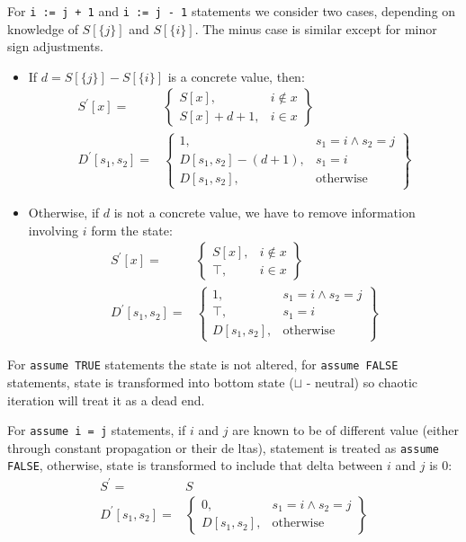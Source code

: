 For \texttt{i := j + 1} and \texttt{i := j - 1} statements we consider two cases, depending on knowledge of $S[\{j\}]$ and $S[\{i\}]$. The minus case is similar except for minor sign adjustments.
\begin{itemize}
\item If $d=S[\{j\}]-S[\{i\}]$ is a concrete value, then:
\begin{align*}
S^\prime[x] = & \left.
	\begin{cases}
		S[x], & i \notin x \\
		S[x] + d + 1, & i \in x
	\end{cases}
\right\}\\
D^\prime[s_1, s_2] = & \left.
	\begin{cases}
		1, & s_1 = i \wedge s_2 = j \\
		D[s_1,s_2] - (d + 1), & s_1 = i \\
		D[s_1,s_2], & \text{otherwise}
	\end{cases}
\right\}
\end{align*}
\item Otherwise, if $d$ is not a concrete value, we have to remove information involving $i$ form the state:
\begin{align*}
S^\prime[x] = & \left.
	\begin{cases}
		S[x], & i \notin x \\
		\top, & i \in x
	\end{cases}
\right\}\\
D^\prime[s_1, s_2] = & \left.
	\begin{cases}
		1, & s_1 = i \wedge s_2 = j \\
		\top, & s_1 = i \\
		D[s_1,s_2], & \text{otherwise}
	\end{cases}
\right\}
\end{align*}
\end{itemize}


For \texttt{assume TRUE} statements the state is not altered, for \texttt{assume FALSE} statements, state is transformed into bottom state ($\sqcup$ - neutral) so chaotic iteration will treat it as a dead end.

For \texttt{assume i = j} statements, if $i$ and $j$ are known to be of different value (either through constant propagation or their de ltas), statement is treated as \texttt{assume FALSE}, otherwise, state is transformed to include that delta between $i$ and $j$ is 0:
\begin{align*}
S^\prime = & S \\
D^\prime[s_1, s_2] = & \left.
	\begin{cases}
		0, & s_1 = i \wedge s_2 = j \\
		D[s_1,s_2], & \text{otherwise}
	\end{cases}
\right\}
\end{align*}

